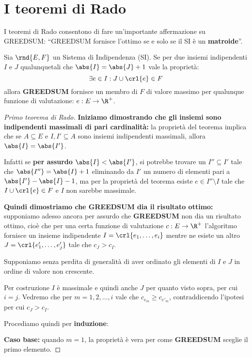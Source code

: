 \documentclass[\main/main.tex]{subfiles}
\begin{document}
\section{I teoremi di Rado}
I teoremi di Rado consentono di fare un'importante affermazione su GREEDSUM: ``GREEDSUM fornisce l'ottimo se e solo se il SI è un \textbf{matroide}''.
\begin{theorem}
  Sia \(\rnd{E, F}\) un Sistema di Indipendenza (SI). Se per due insiemi indipendenti \(I\) e \(J\) qualunquetali che \(\abs{I} = \abs{J} + 1\) vale la proprietà:
  \[
    \exists e \in I: J \cup \crl{e} \in F
  \]
  allora \textbf{GREEDSUM} fornisce un membro di \(F\) di valore massimo per qualunque funzione di valutazione: \(e: E \rightarrow \R^+\).
  \label{primo_rado}
\end{theorem}
\begin{proof}[Primo teorema di Rado]
  \textbf{Iniziamo dimostrando che gli insiemi sono indipendenti massimali di pari cardinalità:} la proprietà del teorema implica che se \(A \subseteq E\) e \(I, I' \subseteq A\) sono insiemi indipendenti massimali, allora \(\abs{I} = \abs{I'}\).

  Infatti se \textbf{per assurdo} \(\abs{I} < \abs{I'}\), si potrebbe trovare un \(I'' \subseteq I'\) tale che \(\abs{I''} = \abs{I} + 1\) eliminando da \(I'\) un numero di elementi pari a \(\abs{I'} - \abs{I} - 1\), ma per la proprietà del teorema esiste \(e \in I'' \setminus I\) tale che \(I \cup \crl{e} \in F\) e \(I\) non sarebbe massimale.

  \textbf{Quindi dimostriamo che GREEDSUM dia il risultato ottimo:} supponiamo adesso ancora per assurdo che \textbf{GREEDSUM} non dia un risultato ottimo, cioè che per una certa funzione di valutazione \(c: E \rightarrow \R^+\) l'algoritmo fornisce un insieme indipendente \(I = \crl{e_1, \ldots, e_i}\) mentre ne esiste un altro \(J = \crl{e'_1, \ldots, e'_j}\) tale che \(c_J > c_I\).

  Supponiamo senza perdita di generalità di aver ordinato gli elementi di \(I\) e \(J\) in ordine di valore non crescente.

  Per costruzione \(I\) è massimale e quindi anche \(J\) per quanto visto sopra, per cui \(i=j\). Vedremo che per \(m=1, 2, \ldots, i\) vale che \(c_{e_m} \geq c_{e'_m}\), contraddicendo l'ipotesi per cui \(c_J > c_I\).

  Procediamo quindi per \textbf{induzione}:

  \textbf{Caso base:} quando \(m=1\), la proprietà è vera per come \textbf{GREEDSUM} sceglie il primo elemento.


\end{proof}
\end{document}
